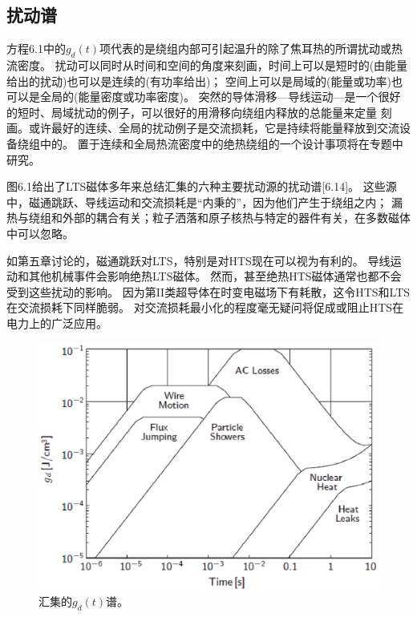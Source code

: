 \subsection{扰动谱}
方程6.1中的$g_d(t)$项代表的是绕组内部可引起温升的除了焦耳热的所谓扰动或热流密度。
扰动可以同时从时间和空间的角度来刻画，时间上可以是短时的(由能量给出的扰动)也可以是连续的(有功率给出)；
空间上可以是局域的(能量或功率)也可以是全局的(能量密度或功率密度)。
突然的导体滑移---导线运动---是一个很好的短时、局域扰动的例子，可以很好的用滑移向绕组内释放的总能量来定量
刻画。或许最好的连续、全局的扰动例子是交流损耗，它是持续将能量释放到交流设备绕组中的。
置于连续和全局热流密度中的绝热绕组的一个设计事项将在专题中研究。

图6.1给出了LTS磁体多年来总结汇集的六种主要扰动源的扰动谱[6.14]。
这些源中，磁通跳跃、导线运动和交流损耗是“内秉的”，因为他们产生于绕组之内；
漏热与绕组和外部的耦合有关；粒子洒落和原子核热与特定的器件有关，在多数磁体中可以忽略。

如第五章讨论的，磁通跳跃对LTS，特别是对HTS现在可以视为有利的。
导线运动和其他机械事件会影响绝热LTS磁体。
然而，甚至绝热HTS磁体通常也都不会受到这些扰动的影响。
因为第II类超导体在时变电磁场下有耗散，这令HTS和LTS在交流损耗下同样脆弱。
对交流损耗最小化的程度毫无疑问将促成或阻止HTS在电力上的广泛应用。

\begin{figure}[htbp]
	\centering
	\includegraphics[scale=0.6]{chpt6/figs/fig6.1.eps}
	\caption{汇集的$g_d(t)$谱。}
\end{figure}


